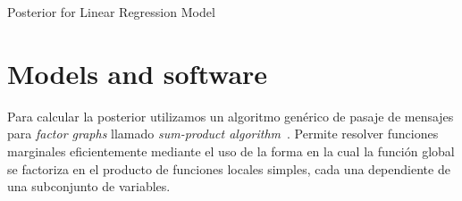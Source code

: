 \documentclass[article]{jss}
\begin{document}
\cite{herbrich2006-trueskill}

\cite{dangauthier2008-trueskillThroughTime}

\cite{herbrich2006-trueskill}

\cite{coulom2008-wholeHistoryRating}

\cite{herbrich2006-trueskill}

\cite{maystre2019-pairwise}

\cite{herbrich2006-trueskill}






\begin{algorithm}[H]
  \caption{Posterior for Linear Regression Model}
  \label{alg:posterior_for_linear_regression_model}
  
\end{algorithm}




























\section{Models and software} \label{sec:computoAnilitico}


Para calcular la posterior utilizamos un algoritmo gen\'erico de pasaje de mensajes para \emph{factor graphs} llamado \emph{sum-product algorithm}~\cite{kschischang2001-factorGraphsAndTheSumProductAlgorithm}.
Permite resolver funciones marginales eficientemente mediante el uso de la forma en la cual la funci\'on global se factoriza en el producto de funciones locales simples, cada una dependiente de una subconjunto de variables.
\end{document}
